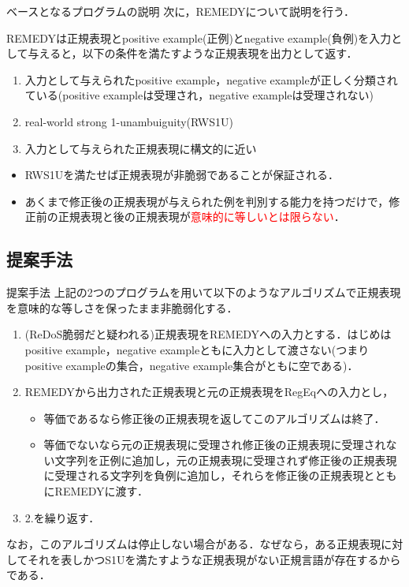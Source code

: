 \documentclass[uplatex,dvipdfmx,11pt,notheorems,aspectratio = 169]{beamer}
\theoremstyle{definition}
\begin{document}
\begin{frame}{ベースとなるプログラムの説明}
次に，REMEDY\cite{remedy}について説明を行う．\vspace{0.2in}

REMEDYは正規表現とpositive example(正例)とnegative example(負例)を入力として与えると，以下の条件を満たすような正規表現を出力として返す．
\begin{enumerate}
  \item 入力として与えられたpositive example，negative exampleが正しく分類されている(positive exampleは受理され，negative exampleは受理されない)
  \item real-world strong 1-unambuiguity(RWS1U)
  \item 入力として与えられた正規表現に構文的に近い
\end{enumerate}
\vspace{0.2in}
\begin{itemize}
  \item RWS1Uを満たせば正規表現が非脆弱であることが保証される．
  \item あくまで修正後の正規表現が与えられた例を判別する能力を持つだけで，修正前の正規表現と後の正規表現が\textcolor{red}{意味的に等しいとは限らない}．
\end{itemize}
\end{frame}



\subsection{提案手法}
\begin{frame}{提案手法}
  上記の2つのプログラムを用いて以下のようなアルゴリズムで正規表現を意味的な等しさを保ったまま非脆弱化する．
  \begin{enumerate}
    \item (ReDoS脆弱だと疑われる)正規表現をREMEDYへの入力とする．はじめはpositive example，negative exampleともに入力として渡さない(つまりpositive exampleの集合，negative example集合がともに空である)．
    \item REMEDYから出力された正規表現と元の正規表現をRegEqへの入力とし，
    \begin{itemize}
      \item 等価であるなら修正後の正規表現を返してこのアルゴリズムは終了．
      \item 等価でないなら元の正規表現に受理され修正後の正規表現に受理されない文字列を正例に追加し，元の正規表現に受理されず修正後の正規表現に受理される文字列を負例に追加し，それらを修正後の正規表現とともにREMEDYに渡す．
    \end{itemize}
    \item 2.を繰り返す．
  \end{enumerate}
  なお，このアルゴリズムは停止しない場合がある．なぜなら，ある正規表現に対してそれを表しかつS1Uを満たすような正規表現がない正規言語が存在するからである．
\end{frame}
\end{document}
